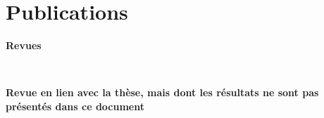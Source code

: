\chapter*{Publications}



{\setlength{\parindent}{0cm}\textbf{Revues}} \\ \medskip

\begin{refsection}

    \small
    \nocite{*} %
    \printbibliography[heading=none]
    
\end{refsection}


\vfill
{}\\ \medskip

\begin{refsection}

    \small
    \nocite{*} %
    \printbibliography[heading=none]
    
\end{refsection}
\vfill

\newpage
\vfill
{\setlength{\parindent}{0cm}\textbf{Revue en lien avec la thèse, mais dont les résultats ne sont pas présentés dans ce document}}\\ \medskip

\begin{refsection}

    \small
    \nocite{*} %
    \printbibliography[heading=none]
    
\end{refsection}
